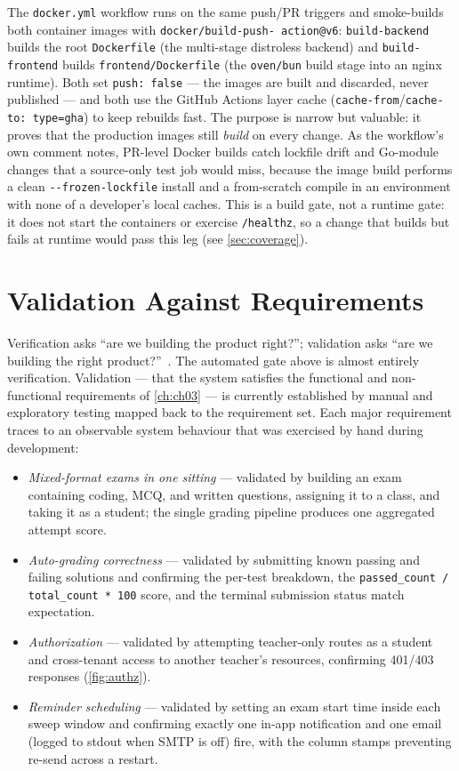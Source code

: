 The \texttt{docker.yml} workflow runs on the same push/PR triggers and
smoke-builds both container images with \texttt{docker/build-push-\allowbreak
action@v6}: \texttt{build-backend} builds the root \texttt{Dockerfile}
(the multi-stage distroless backend) and \texttt{build-frontend} builds
\texttt{frontend/Dockerfile} (the \texttt{oven/bun} build stage into an
nginx runtime). Both set \texttt{push: false} --- the images are built and
discarded, never published --- and both use the GitHub Actions layer
cache (\texttt{cache-from}/\texttt{cache-to: type=gha}) to keep rebuilds
fast. The purpose is narrow but valuable: it proves that the production
images still \emph{build} on every change. As the workflow's own comment
notes, PR-level Docker builds catch lockfile drift and Go-module changes
that a source-only test job would miss, because the image build performs
a clean \texttt{-{}-frozen-lockfile} install and a from-scratch compile in
an environment with none of a developer's local caches. This is a build
gate, not a runtime gate: it does not start the containers or exercise
\texttt{/healthz}, so a change that builds but fails at runtime would pass
this leg (see \cref{sec:coverage}).

\section{Validation Against Requirements}

Verification asks ``are we building the product right?''; validation asks
``are we building the right product?''~\cite{sommerville-se}. The
automated gate above is almost entirely verification. Validation --- that
the system satisfies the functional and non-functional requirements of
\cref{ch:ch03} --- is currently
established by manual and exploratory testing mapped back to the
requirement set. Each major requirement traces to an observable system
behaviour that was exercised by hand during development:

\begin{itemize}
  \item \emph{Mixed-format exams in one sitting} --- validated by
  building an exam containing coding, MCQ, and written questions,
  assigning it to a class, and taking it as a student; the single
  grading pipeline produces one aggregated attempt score.
  \item \emph{Auto-grading correctness} --- validated by submitting known
  passing and failing solutions and confirming the per-test breakdown,
  the \texttt{passed\_count / total\_count * 100} score, and the terminal
  submission status match expectation.
  \item \emph{Authorization} --- validated by attempting teacher-only
  routes as a student and cross-tenant access to another teacher's
  resources, confirming 401/403 responses (\cref{fig:authz}).
  \item \emph{Reminder scheduling} --- validated by setting an exam start
  time inside each sweep window and confirming exactly one in-app
  notification and one email (logged to stdout when SMTP is off) fire,
  with the column stamps preventing re-send across a restart.
\end{itemize}

